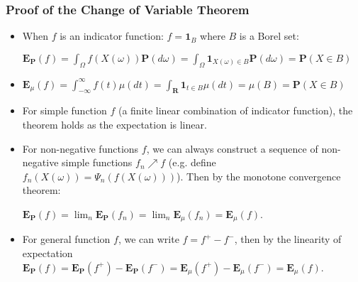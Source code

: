 \documentclass[handout]{beamer}
\newcommand{\BP}{\mathbf{P}}
\newcommand{\BE}{\mathbf{E}}
\newcommand{\BI}{\mathbf{1}}
\begin{document}
\frame
{
  \frametitle{Proof of the Change of Variable Theorem}

   \begin{itemize}
  
                \item<1->[1)] When $f$ is an indicator function: $f=\BI_B$ where $B$ is a Borel set: 
                
                $\BE_{\BP} (f)=  \int_{\Omega} f(X(\omega) )\mathbf{P} (d\omega)=\int_{\Omega} \BI_{X(\omega) \in B} \mathbf{P} (d\omega)=\BP(X\in B)$                
                \item<2->[]    $\BE_{\mu}(f) = \int_{-\infty}^{\infty} f(t) \mu(dt) =\int_{\mathbf{R}} \BI_{t \in B} \mu(dt)=\mu(B)=\BP(X\in B)$

                             
               \item<3->[2)] For simple function $f$ (a finite linear combination of indicator function), the theorem holds as the expectation is linear.     
               
                              \item<4->[3)] For non-negative functions $f$, we can always construct a sequence of non-negative simple functions $f_n\nearrow f$ (e.g. define $f_n(X(\omega)) = \Psi_n(f(X(\omega)))$). Then by the monotone convergence theorem: 
                              
                              $\BE_{\BP} (f) =\lim_n \BE_{\BP} (f_n)=\lim_n \BE_{\mu} (f_n) =\BE_{\mu} (f)$.
                              
               
                              \item<4->[4)] For general function $f$, we can write $f=f^+-f^-$, then by the linearity of expectation                              
                              $\BE_{\BP} (f) =\BE_{\BP} (f^+)- \BE_{\BP} (f^-)=\BE_{\mu} (f^+)- \BE_{\mu} (f^-)=\BE_{\mu} (f)$.
                                                      
\end{itemize}
}
\end{document}
